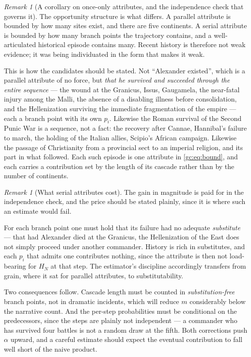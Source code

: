 \documentclass[11pt]{article}
\numberwithin{equation}{section}
\theoremstyle{plain}
\theoremstyle{definition}
\theoremstyle{remark}
\newtheorem{remark}[theorem]{Remark}
\begin{document}
\begin{remark}[A corollary on once-only attributes, and the independence
check that governs it]
\noindent The opportunity structure is what differs. A parallel
attribute is bounded by how many sites exist, and there are five
continents. A serial attribute is bounded by how many branch points the
trajectory contains, and a well-articulated historical episode contains
many. Recent history is therefore not weak evidence; it was being
individuated in the form that makes it weak.

This is how the candidates should be stated. Not ``Alexander existed'',
which is a parallel attribute of no force, but \emph{that he survived
and succeeded through the entire sequence} --- the wound at the
Granicus, Issus, Gaugamela, the near-fatal injury among the Malli, the
absence of a disabling illness before consolidation, and the
Hellenization surviving the immediate fragmentation of the empire ---
each a branch point with its own $p_i$. Likewise the Roman survival of
the Second Punic War is a sequence, not a fact: the recovery after
Cannae, Hannibal's failure to march, the holding of the Italian allies,
Scipio's African campaign. Likewise the passage of Christianity from a
provincial sect to an imperial religion, and its part in what followed.
Each such episode is one attribute in \eqref{gc:eq:bound}, and each
carries a contribution set by the length of its cascade rather than by
the number of continents.

\begin{remark}[What serial attributes cost]\label{gc:rem:serialcost}
The gain in magnitude is paid for in the independence check, and the
price should be stated plainly, since it is where such an estimate would
fail.

For each branch point one must hold that its failure had no adequate
\emph{substitute} --- that had Alexander died at the Granicus, the
Hellenization of the East does not simply proceed under another
commander. History is rich in substitutes, and each $p_i$ that admits
one contributes nothing, since the attribute is then not load-bearing
for $H_N$ at that step. The estimator's discipline accordingly transfers
from grain, where it sat for parallel attributes, to substitutability.

Two consequences follow. Cascade length must be counted in
\emph{substitution-free} branch points, not in dramatic incidents, which
will reduce $m$ considerably below the narrative count. And the
per-step probabilities must be conditional on the predecessors, since
the steps are plainly not independent --- a commander who has survived
four battles is not a random draw at the fifth. Both corrections push
$\alpha$ upward, and a careful estimate should expect the eventual
contribution to fall well short of the naive product.
\end{remark}


\end{remark}
\end{document}
